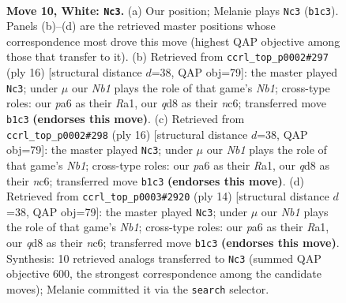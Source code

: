 \documentclass[11pt]{article}
\begin{document}
\clearpage

\begin{figure}[p]\centering
\begin{subfigure}{0.46\textwidth}\centering
\resizebox{\linewidth}{!}{%
\newchessgame
\chessboard[
  setfen={rnbqkb1r/1p3p2/p3pnp1/7p/P2P4/1B3N2/1P3PPP/RNBQ1RK1 w kq - 0 10},
  showmover=false,
  pgfstyle=straightmove, color=movearrow, markmove={b1-c3}
]}
\caption{}
\end{subfigure}\hfill
\begin{subfigure}{0.46\textwidth}\centering
\resizebox{\linewidth}{!}{%
\newchessgame
\chessboard[
  setfen={r1bqkb1r/pp3ppp/2n1pn2/8/2BP4/5N2/PP3PPP/RNBQ1RK1 w kq - 1 9},
  showmover=false,
  pgfstyle=straightmove, color=movearrow, markmove={b1-c3}
]}
\caption{}
\end{subfigure}
\\[4pt]
\begin{subfigure}{0.46\textwidth}\centering
\resizebox{\linewidth}{!}{%
\newchessgame
\chessboard[
  setfen={r1bqkb1r/pp3ppp/2n1pn2/8/2BP4/5N2/PP3PPP/RNBQ1RK1 w kq - 1 9},
  showmover=false,
  pgfstyle=straightmove, color=movearrow, markmove={b1-c3}
]}
\caption{}
\end{subfigure}\hfill
\begin{subfigure}{0.46\textwidth}\centering
\resizebox{\linewidth}{!}{%
\newchessgame
\chessboard[
  setfen={r1bqkb1r/pp3ppp/2n1pn2/8/2BP4/5N2/PP3PPP/RNBQ1RK1 w kq - 1 8},
  showmover=false,
  pgfstyle=straightmove, color=movearrow, markmove={b1-c3}
]}
\caption{}
\end{subfigure}
\caption{\textbf{Move 10, White: \texttt{Nc3}.} (a) Our position; Melanie plays \texttt{Nc3} (\texttt{b1c3}). Panels (b)--(d) are the retrieved master positions whose correspondence most drove this move (highest QAP objective among those that transfer to it). (b) Retrieved from \texttt{ccrl\_top\_p0002\#297} (ply 16) [structural distance $d$=38, QAP obj=79]: the master played \texttt{Nc3}; under $\mu$ our \emph{Nb1} plays the role of that game's \emph{Nb1}; cross-type roles: our \emph{p}a6 as their \emph{R}a1, our \emph{q}d8 as their \emph{n}c6; transferred move \texttt{b1c3} \textbf{(endorses this move)}. (c) Retrieved from \texttt{ccrl\_top\_p0002\#298} (ply 16) [structural distance $d$=38, QAP obj=79]: the master played \texttt{Nc3}; under $\mu$ our \emph{Nb1} plays the role of that game's \emph{Nb1}; cross-type roles: our \emph{p}a6 as their \emph{R}a1, our \emph{q}d8 as their \emph{n}c6; transferred move \texttt{b1c3} \textbf{(endorses this move)}. (d) Retrieved from \texttt{ccrl\_top\_p0003\#2920} (ply 14) [structural distance $d$=38, QAP obj=79]: the master played \texttt{Nc3}; under $\mu$ our \emph{Nb1} plays the role of that game's \emph{Nb1}; cross-type roles: our \emph{p}a6 as their \emph{R}a1, our \emph{q}d8 as their \emph{n}c6; transferred move \texttt{b1c3} \textbf{(endorses this move)}. Synthesis: 10 retrieved analogs transferred to \texttt{Nc3} (summed QAP objective 600, the strongest correspondence among the candidate moves); Melanie committed it via the \texttt{search} selector.}
\label{fig:thought-m18}
\end{figure}
\end{document}
